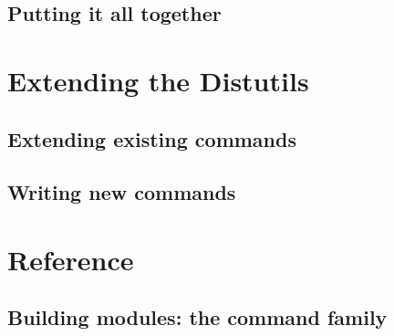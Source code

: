 \documentclass{howto}
\begin{document}
\subsection{Putting it all together}



\section{Extending the Distutils}
\label{extending}


\subsection{Extending existing commands}
\label{extend-existing}


\subsection{Writing new commands}
\label{new-commands}



\section{Reference}
\label{ref}


\subsection{Building modules: the \protect{} command family}
\label{build-cmds}

\subsubsection{\protect{}}
\label{build-cmd}

\subsubsection{\protect{}}
\label{build-py-cmd}

\subsubsection{\protect{}}
\label{build-ext-cmd}

\subsubsection{\protect{}}
\label{build-clib-cmd}
\end{document}
